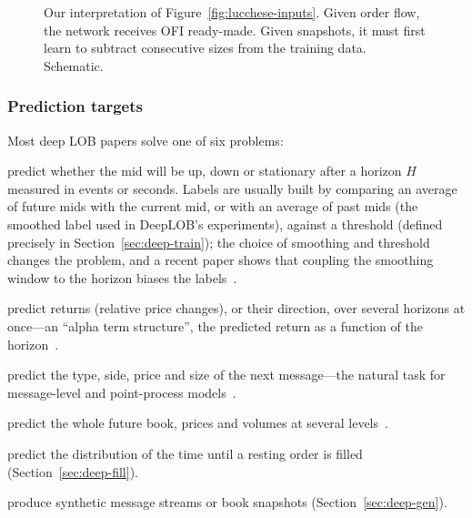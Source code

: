 \begin{figure}[!htbp]
\centering
{}
\caption{Our interpretation of Figure~\ref{fig:lucchese-inputs}. Given order flow, the network receives OFI ready-made.
Given snapshots, it must first learn to subtract consecutive sizes from the training data. Schematic.}
\label{fig:input-readymade}
\end{figure}

\subsubsection{Prediction targets}
\label{sec:deep-io-targets}

Most deep LOB papers solve one of six problems:
\begin{description}[leftmargin=1.5em,style=nextline,itemsep=2pt]
\item[Direction classification] predict whether the mid will be up, down or stationary after a horizon $H$
  measured in events or seconds. Labels are usually built by comparing an average of future mids with the current mid, or
  with an average of past mids (the smoothed label used in DeepLOB's experiments), against a threshold (defined precisely in Section~\ref{sec:deep-train}); the choice of smoothing and threshold changes the problem, and a recent paper
  shows that coupling the smoothing window to the horizon biases the labels~\citep{berti2025tlob}.
\item[Multi-horizon forecasting] predict returns (relative price changes), or their direction, over several horizons at
  once---an ``alpha term structure'', the predicted return as a function of the horizon~\citep{kolm2023,zhangzohren2021}.
\item[Next-event prediction] predict the type, side, price and size of the next message---the
  natural task for message-level and point-process models~\citep{linna2025lobert}.
\item[Full-book forecasting] predict the whole future book, prices and volumes at several
  levels~\citep{arxiv240902277}.
\item[Fill-time estimation] predict the distribution of the time until a resting order is filled
  (Section~\ref{sec:deep-fill}).
\item[Generation] produce synthetic message streams or book snapshots (Section~\ref{sec:deep-gen}).
\end{description}

